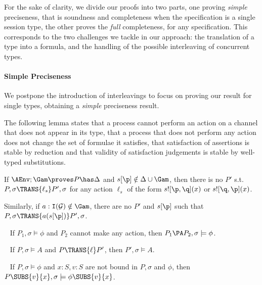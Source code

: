 For the sake of clarity, we divide our proofs into two parts, one
proving \emph{simple} preciseness, that is soundness and completeness
when the specification is a single session type, the other proves the
\emph{full} completeness, for any specification. This corresponds to
the two challenges we tackle in our approach: the translation of a type
into a formula, and the handling of the possible interleaving of
concurrent types.


\paragraph{Simple Preciseness}

We postpone the introduction of interleavings to focus on proving our
result for single types, obtaining a \emph{simple} preciseness result.

The following lemma states that a process cannot perform an action on
a channel that does not appear in its type, that a process that does
not perform any action does not change the set of formulae it satisfies, 
that satisfaction of assertions is stable by reduction and
that validity of satisfaction judgements is stable by well-typed
substitutions.

\begin{LEM}
\label{lemma:hml:typsaf}
If $\AEnv;\Gam \proves P \has  \Delta$ and $s[\p] \notin \Delta \cup
\Gam$, then there is no $P'$ s.t. $P,\sigma \TRANS{\ell_s}
P',\sigma$ for any action $\ell_s$ of the form $s![\p,\q](x)$ or $s![\q,\p](x)$.

Similarly, if $a:\mathtt{I}(\mathcal{G}) \notin \Gam$, there are no
$P'$ and $s[\p]$ such that $P,\sigma \TRANS{a(s[\p])} P',\sigma$.

~\label{lemma:hml:comptriv}
If $P_1,\sigma \models \phi$ and $P_2$ cannot make any action, then
$P_1 \PA P_2, \sigma \models \phi$.

~\label{lemma:hml:stabass}
If $P,\sigma \models A$ and $P \TRANS{\ell} P'$, then $P',\sigma
\models A$.

~\label{lemma:hml:satsub}
If $P,\sigma \models \phi$ and $x:S,v:S$ are not bound in $P,\sigma$
and $\phi$, then $P\SUBS{v}{x},\sigma \models \phi\SUBS{v}{x}$.
\end{LEM}

